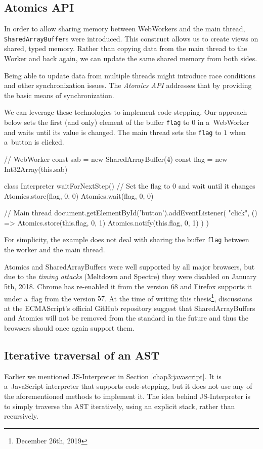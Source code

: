 \subsection*{Atomics API}
\label{chap4:atomics}
In order to allow sharing memory between WebWorkers and the main thread, \texttt{SharedArrayBuffer}s were introduced. This construct allows us to create
views on shared, typed memory. Rather than copying data from the main thread to the Worker and back again, we can update the same shared memory from both sides.

Being able to update data from multiple threads might introduce race conditions and other synchronization issues. The \emph{Atomics API} addresses that by providing
the basic means of synchronization.

We can leverage these technologies to implement code-stepping. Our approach below sets the first (and only) element of the buffer \texttt{flag} to $0$ in a~WebWorker
and waits until its value is changed. The main thread sets the \texttt{flag} to $1$ when a~button is clicked.
\newpage
\begin{code}
// WebWorker
const sab = new SharedArrayBuffer(4)
const flag = new Int32Array(this.sab)

class Interpreter {
    waitForNextStep() {
        // Set the flag to 0 and wait until it changes
        Atomics.store(flag, 0, 0)
        Atomics.wait(flag, 0, 0)
    }
}

// Main thread
document.getElementById('button').addEventListener(
    "click",
    () => {
        Atomics.store(this.flag, 0, 1)
        Atomics.notify(this.flag, 0, 1)
    })
)
\end{code}
For simplicity, the example does not deal with sharing the buffer \texttt{flag} between the worker and the main thread.

Atomics and SharedArrayBuffers were well supported by all major browsers, but due to the \emph{timing attacks} (Meltdown and Spectre) they were disabled on
January 5th, 2018. Chrome has re-enabled it from the version $68$ and Firefox supports it under a~flag from the version $57$. At the time of
writing this thesis\footnote{December 26th, 2019}, discussions at the ECMAScript's official GitHub repository suggest that SharedArrayBuffers and Atomics
will not be removed from the standard in the future and thus the browsers should once again support them.

\subsection*{Iterative traversal of an AST}
Earlier we mentioned JS-Interpreter \cite{JSInterpreter} in Section \ref{chap3:javascript}. It is a~JavaScript interpreter that supports code-stepping, but
it does not use any of the aforementioned methods to implement it. The idea behind JS-Interpreter is to simply traverse the AST iteratively, using an explicit
stack, rather than recursively.

